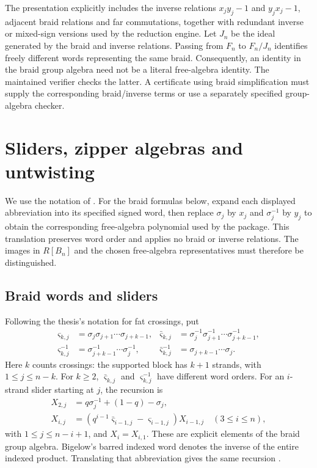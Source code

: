\documentclass[11pt]{article}
\begin{document}
The presentation explicitly includes the inverse relations $x_jy_j-1$ and
$y_jx_j-1$, adjacent braid relations and far commutations, together with
redundant inverse or mixed-sign versions used by the reduction engine. Let
$J_n$ be the ideal generated by the braid and inverse relations. Passing from
$F_n$ to $F_n/J_n$ identifies freely different words representing the same braid.
Consequently, an identity in the braid group algebra need not be a literal
free-algebra identity. The maintained verifier checks the latter. A certificate
using braid simplification must supply the corresponding braid/inverse terms
or use a separately specified group-algebra checker.

\section{Sliders, zipper algebras and untwisting}
We use the notation of \cite[Definitions~2.6, 2.9 and~3.1]{thesis}.
For the braid formulas below, expand each displayed abbreviation into its
specified signed word, then replace $\sigma_j$ by $x_j$ and $\sigma_j^{-1}$ by
$y_j$ to obtain the corresponding free-algebra polynomial used by the package.
This translation preserves word order and applies no braid or inverse
relations. The images in $R[B_n]$ and the chosen free-algebra representatives
must therefore be distinguished.

\subsection{Braid words and sliders}
Following the thesis's notation for fat crossings, put
\begin{align*}
 \varsigma_{k,j}&=\sigma_j\sigma_{j+1}\cdots\sigma_{j+k-1},&
 \bar{\varsigma}_{k,j}&=\sigma_j^{-1}\sigma_{j+1}^{-1}\cdots\sigma_{j+k-1}^{-1},\\
 \varsigma_{k,j}^{-1}&=\sigma_{j+k-1}^{-1}\cdots\sigma_j^{-1},&
 \bar{\varsigma}_{k,j}^{-1}&=\sigma_{j+k-1}\cdots\sigma_j.
\end{align*}
Here $k$ counts crossings: the supported block has $k+1$ strands, with
$1\le j\le n-k$. For $k\ge2$, $\bar{\varsigma}_{k,j}$ and
$\varsigma_{k,j}^{-1}$ have different word orders.
For an $i$-strand slider starting at $j$, the recursion is
\begin{align*}
 X_{2,j}&=q\sigma_j^{-1}+(1-q)-\sigma_j,\\
 X_{i,j}&=(q^{i-1}\bar{\varsigma}_{i-1,j}-\varsigma_{i-1,j})X_{i-1,j}
       \quad(3\le i\le n),
\end{align*}
with $1\le j\le n-i+1$, and $X_i=X_{i,1}$. These are explicit elements of
the braid group algebra. Bigelow's barred indexed word denotes the inverse
of the entire indexed product. Translating that abbreviation gives the same
recursion \cite[p.~298]{bigelow}.
\end{document}
